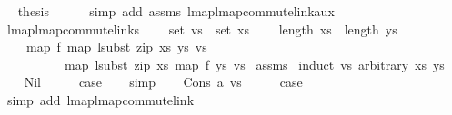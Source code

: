 \begin{isabellebody}
\ \isamarkupfalse%
\ {\isacharquery}{\kern0pt}thesis\isanewline
\ \ \ \ \isamarkupfalse%
\ {\isacharparenleft}{\kern0pt}simp\ add{\isacharcolon}{\kern0pt}\ assms{\isacharparenleft}{\kern0pt}{}{\isacharcomma}{\kern0pt}{}{\isacharparenright}{\kern0pt}\ lmap{\isacharunderscore}{\kern0pt}lmap{\isacharunderscore}{\kern0pt}commute{\isacharunderscore}{\kern0pt}link{\isacharunderscore}{\kern0pt}aux{\isacharparenright}{\kern0pt}\isanewline
{}\isamarkupfalse%
%
\endisatagproof
{\isafoldproof}%
%
\isadelimproof
\isanewline
%
\endisadelimproof
\isanewline
\isanewline
{}\isamarkupfalse%
\ lmap{\isacharunderscore}{\kern0pt}lmap{\isacharunderscore}{\kern0pt}commute{\isacharunderscore}{\kern0pt}links{\isacharcolon}{\kern0pt}\isanewline
\ \ \ \ {\isachardoublequoteopen}set\ vs\ {\isasymsubseteq}\ set\ xs{\isachardoublequoteclose}\isanewline
\ \ \ \ {\isachardoublequoteopen}length\ xs\ {\isacharequal}{\kern0pt}\ length\ ys{\isachardoublequoteclose}\isanewline
\ \ \ \ {\isachardoublequoteopen}map\ f\ {\isacharparenleft}{\kern0pt}map\ {\isacharparenleft}{\kern0pt}lsubst\ {\isacharparenleft}{\kern0pt}zip\ xs\ ys{\isacharparenright}{\kern0pt}{\isacharparenright}{\kern0pt}\ vs{\isacharparenright}{\kern0pt}\ {\isacharequal}{\kern0pt}\isanewline
\ \ \ \ \ \ \ \ \ \ map\ {\isacharparenleft}{\kern0pt}lsubst\ {\isacharparenleft}{\kern0pt}zip\ xs\ {\isacharparenleft}{\kern0pt}map\ f\ ys{\isacharparenright}{\kern0pt}{\isacharparenright}{\kern0pt}{\isacharparenright}{\kern0pt}\ vs{\isachardoublequoteclose}\isanewline
%
\isadelimproof
%
\endisadelimproof
%
\isatagproof
{}\isamarkupfalse%
\ assms\isanewline
{}\isamarkupfalse%
\ {\isacharparenleft}{\kern0pt}induct\ vs\ arbitrary{\isacharcolon}{\kern0pt}\ xs\ ys{\isacharparenright}{\kern0pt}\isanewline
\ \ \isamarkupfalse%
\ Nil\isanewline
\ \ \isamarkupfalse%
\ \isamarkupfalse%
\ {\isacharquery}{\kern0pt}case\isanewline
\ \ \isamarkupfalse%
\ simp\isanewline
{}\isamarkupfalse%
\isanewline
\ \ \isamarkupfalse%
\ {\isacharparenleft}{\kern0pt}Cons\ a\ vs{\isacharparenright}{\kern0pt}\isanewline
\ \ \isamarkupfalse%
\ \isamarkupfalse%
\ {\isacharquery}{\kern0pt}case\isanewline
\ \ \isamarkupfalse%
\ {\isacharparenleft}{\kern0pt}simp\ add{\isacharcolon}{\kern0pt}\ lmap{\isacharunderscore}{\kern0pt}lmap{\isacharunderscore}{\kern0pt}commute{\isacharunderscore}{\kern0pt}link{\isacharparenright}{\kern0pt}\isanewline

\end{isabellebody}
